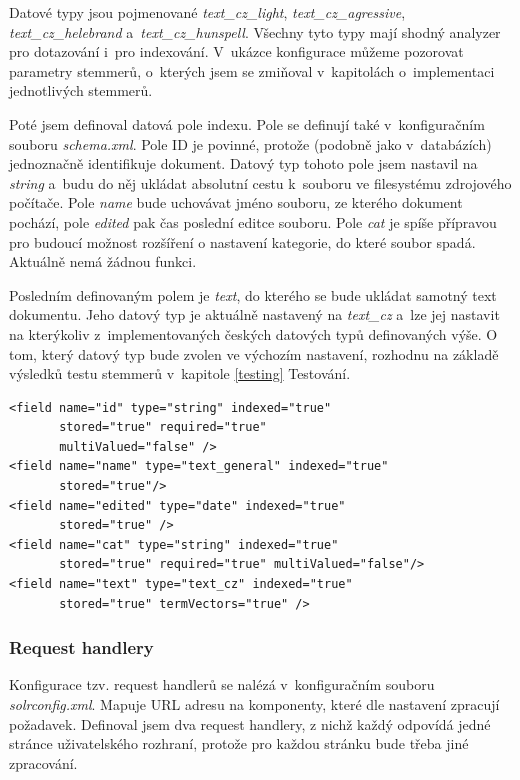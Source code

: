 Datové typy jsou pojmenované \emph{text\_cz\_light}, \emph{text\_cz\_agressive}, \emph{text\_cz\_helebrand} a~\emph{text\_cz\_hunspell}. Všechny tyto typy mají shodný analyzer pro dotazování i~pro indexování. V~ukázce konfigurace můžeme pozorovat parametry stemmerů, o~kterých jsem se zmiňoval v~kapitolách o~implementaci jednotlivých stemmerů.

Poté jsem definoval datová pole indexu. Pole se definují také v~konfiguračním souboru \emph{schema.xml}. Pole ID je povinné, protože (podobně jako v~databázích) jednoznačně identifikuje dokument. Datový typ tohoto pole jsem nastavil na \emph{string} a~budu do něj ukládat absolutní cestu k~souboru ve filesystému zdrojového počítače. Pole \emph{name} bude uchovávat jméno souboru, ze kterého dokument pochází, pole \emph{edited} pak čas poslední editce souboru. Pole \emph{cat} je spíše přípravou pro budoucí možnost rozšíření o nastavení kategorie, do které soubor spadá. Aktuálně nemá žádnou funkci.

Posledním definovaným polem je \emph{text}, do kterého se bude ukládat samotný text dokumentu. Jeho datový typ je aktuálně nastavený na \emph{text\_cz} a~lze jej nastavit na kterýkoliv z~implementovaných českých datových typů definovaných výše. O tom, který datový typ bude zvolen ve výchozím nastavení, rozhodnu na základě výsledků testu stemmerů v~kapitole \ref{testing} Testování. 

\begin{verbatim}
<field name="id" type="string" indexed="true" 
       stored="true" required="true" 
       multiValued="false" /> 
<field name="name" type="text_general" indexed="true" 
       stored="true"/>
<field name="edited" type="date" indexed="true" 
       stored="true" />
<field name="cat" type="string" indexed="true" 
       stored="true" required="true" multiValued="false"/>
<field name="text" type="text_cz" indexed="true" 
       stored="true" termVectors="true" />
\end{verbatim}

\subsubsection{Request handlery}
Konfigurace tzv. request handlerů se nalézá v~konfiguračním souboru \emph{solrconfig.xml}. Mapuje URL adresu na komponenty, které dle nastavení zpracují požadavek. Definoval jsem dva request handlery, z nichž každý odpovídá jedné stránce uživatelského rozhraní, protože pro každou stránku bude třeba jiné zpracování. 

